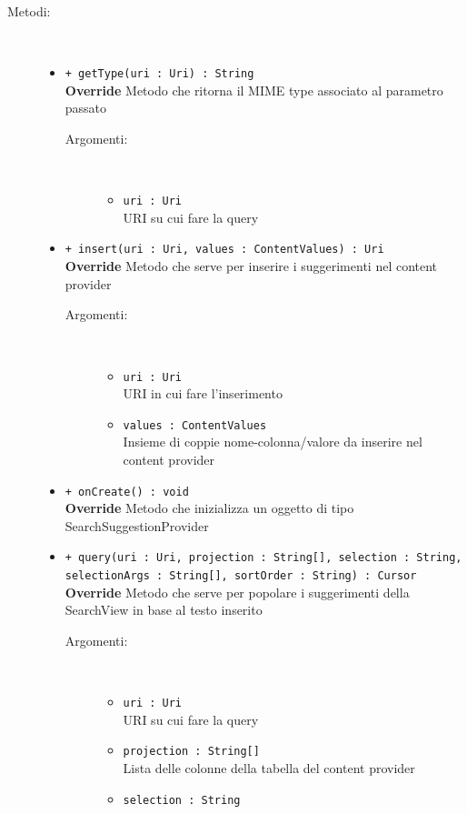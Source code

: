 \documentclass[../DefinizioneDiProdotto.tex]{subfiles}
\begin{document}
\begin{description}
\begin{itemize}
\end{itemize}
\item[Metodi:] \
\begin{itemize}
\item \texttt{+ getType(uri : Uri) : String}\\
\textbf{Override} Metodo che ritorna il MIME type associato al parametro passato
 \begin{description}
\item[Argomenti:] \
\begin{itemize}
\item \texttt{uri : Uri}\\
URI su cui fare la query\end{itemize}
\end{description}
\item \texttt{+ insert(uri : Uri, values : ContentValues) : Uri}\\
\textbf{Override} Metodo che serve per inserire i suggerimenti nel content provider
 \begin{description}
\item[Argomenti:] \
\begin{itemize}
\item \texttt{uri : Uri}\\
URI in cui fare l'inserimento\item \texttt{values : ContentValues}\\
Insieme di coppie nome-colonna/valore da inserire nel content provider \end{itemize}
\end{description}
\item \texttt{+ onCreate() : void}\\
\textbf{Override} Metodo che inizializza un oggetto di tipo SearchSuggestionProvider
 \item \texttt{+ query(uri : Uri, projection : String[], selection : String, selectionArgs : String[], sortOrder : String) : Cursor}\\
\textbf{Override} Metodo che serve per popolare i suggerimenti della SearchView in base al testo inserito
 \begin{description}
\item[Argomenti:] \
\begin{itemize}
\item \texttt{uri : Uri}\\
URI su cui fare la query\item \texttt{projection : String[]}\\
Lista delle colonne della tabella del content provider\item \texttt{selection : String}\\

\end{itemize}
\end{description}
\end{itemize}
\end{description}
\end{document}
